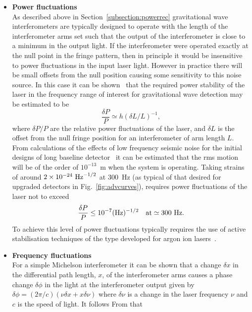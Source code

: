 \documentclass{article}
\begin{document}
\begin{itemize}
\item {\bf Power fluctuations} \\
As described above in Section~\ref{subsection:powerrec} gravitational wave
interferometers are typically designed to operate with the length of the
interferometer arms set such that the output of the interferometer is close to a
minimum in the output light. If the interferometer were operated exactly at the
null point in the fringe pattern, then in principle it would be insensitive to
power fluctuations in the input laser light. However in practice there will be
small offsets from the null position causing some sensitivity to this noise
source.  In this case it can be shown~\cite{Hough} that the required power
stability of the laser in the frequency range of interest for gravitational
wave detection may be estimated to be
%
\begin{equation}
  \frac{\delta P}{P} \simeq h (\delta L/L)^{-1},
  \label{equation:intnoise1}
\end{equation}
%
where $\delta P/P$ are the relative power fluctuations of the laser, and
$\delta L$ is the offset from the null fringe position for an interferometer of
arm length $L$.  From calculations of the effects of low frequency seismic
noise for the initial designs of long baseline detector~\cite{Hough} it can be
estimated that the rms motion will be of the order of $10^{-13}$~m when the
system is operating. Taking strains of around $2 \times 10^{-24}~{\rm
Hz}^{-1/2}$ at 300~Hz (as typical of that desired for upgraded detectors in
Fig.~\ref{fig:advcurves}), requires power fluctuations of the laser not to
exceed
%
\begin{equation}
  \frac{\delta P}{P} \leq 10^{-7} (\rm Hz)^{-1/2} \quad {\rm at}
  \simeq 300 {\rm \ Hz}.
  \label{equation:intnoise2}
\end{equation}
%
To achieve this level of power fluctuations typically requires the use of
active stabilisation techniques of the type developed for argon ion
lasers~\cite{Mangan}.
%
\item {\bf Frequency fluctuations} \\
For a simple Michelson interferometer it can be shown that a change $\delta x$
in the differential path length, $x$, of the interferometer arms causes a phase
change $\delta \phi$ in the light at the interferometer output given by $\delta
\phi = (2\pi/c) (\nu \delta x + x \delta\nu)$ where $\delta \nu$ is a change in
the laser frequency $\nu$ and $c$ is the speed of light. It follows From that

\end{itemize}
\end{document}
